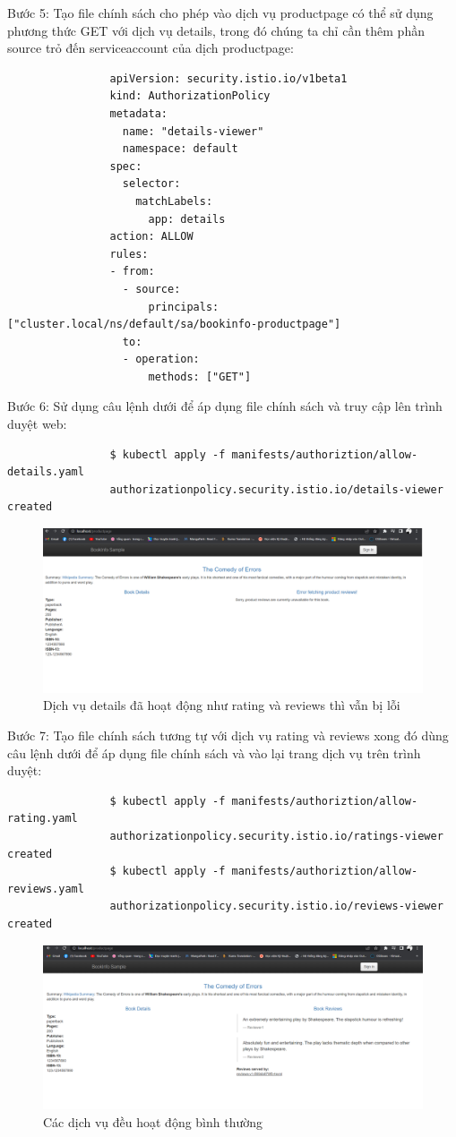 \documentclass[12pt,a4paper]{report}
\begin{document}
{{				Bước 5: Tạo file chính sách cho phép vào dịch vụ productpage có thể sử dụng phương thức GET với dịch vụ details, trong đó chúng ta chỉ cần thêm phần source trỏ đến serviceaccount của dịch productpage:
				\begin{lstlisting}
				apiVersion: security.istio.io/v1beta1
				kind: AuthorizationPolicy
				metadata:
				  name: "details-viewer"
				  namespace: default
				spec:
				  selector:
				    matchLabels:
				      app: details
				action: ALLOW
				rules:
				- from:
				  - source:
				      principals: ["cluster.local/ns/default/sa/bookinfo-productpage"]
				  to:
				  - operation:
				      methods: ["GET"]
				\end{lstlisting}
	
			 	Bước 6: Sử dụng câu lệnh dưới để áp dụng file chính sách và truy cập lên trình duyệt web:
			 	\begin{lstlisting}
			 	$ kubectl apply -f manifests/authoriztion/allow-details.yaml 
			 	authorizationpolicy.security.istio.io/details-viewer created
			 	\end{lstlisting}

				\begin{figure}[h]
					\centering
					\includegraphics[width=0.7\linewidth]{Pics/3.3.2-p3}
					\caption{Dịch vụ details đã hoạt động như rating và reviews thì vẫn bị lỗi}
					\label{fig:3}
				\end{figure}

				Bước 7: Tạo file chính sách tương tự với dịch vụ rating và reviews xong đó dùng câu lệnh dưới để áp dụng file chính sách và vào lại trang dịch vụ trên trình duyệt:
				\begin{lstlisting}
				$ kubectl apply -f manifests/authoriztion/allow-rating.yaml 
				authorizationpolicy.security.istio.io/ratings-viewer created
				$ kubectl apply -f manifests/authoriztion/allow-reviews.yaml 
				authorizationpolicy.security.istio.io/reviews-viewer created
				\end{lstlisting}
				\begin{figure}[h]
					\centering
					\includegraphics[width=0.7\linewidth]{Pics/3.3.2-p4}
					\caption{Các dịch vụ đều hoạt động bình thường}
					\label{fig:3}
				\end{figure}
		\pagebreak
}}
\end{document}

